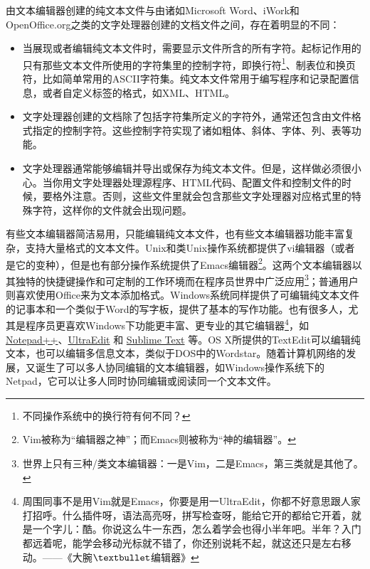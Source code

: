 \documentclass[11pt,a4paper,twoside]{book}
\begin{document}
由文本编辑器创建的纯文本文件与由诸如Microsoft Word、iWork和OpenOffice.org之类的文字处理器创建的文档文件之间，存在着明显的不同：
\begin{itemize}
  \item 当展现或者编辑纯文本文件时，需要显示文件所含的所有字符。起标记作用的只有那些文本文件所使用的字符集里的控制字符，即换行符\footnote{不同操作系统中的换行符有何不同？}、制表位和换页符，比如简单常用的ASCII字符集。纯文本文件常用于编写程序和记录配置信息，或者自定义标签的格式，如XML、HTML。
  \item 文字处理器创建的文档除了包括字符集所定义的字符外，通常还包含由文件格式指定的控制字符。这些控制字符实现了诸如粗体、斜体、字体、列、表等功能。
  \item 文字处理器通常能够编辑并导出或保存为纯文本文件。但是，这样做必须很小心。当你用文字处理器处理源程序、HTML代码、配置文件和控制文件的时候，要格外注意。否则，这些文件里就会包含那些文字处理器对应格式里的特殊字符，这样你的文件就会出现问题。
\end{itemize}

有些文本编辑器简洁易用，只能编辑纯文本文件，也有些文本编辑器功能丰富复杂，支持大量格式的文本文件。Unix和类Unix操作系统都提供了vi编辑器（或者是它的变种），但是也有部分操作系统提供了Emacs编辑器\footnote{Vim被称为“编辑器之神”；而Emacs则被称为“神的编辑器”。}。这两个文本编辑器以其独特的快捷键操作和可定制的工作环境而在程序员世界中广泛应用\footnote{世界上只有三种/类文本编辑器：一是Vim，二是Emacs，第三类就是其他了。}；普通用户则喜欢使用Office来为文本添加格式。Windows系统同样提供了可编辑纯文本文件的记事本和一个类似于Word的写字板，提供了基本的写作功能。也有很多人，尤其是程序员更喜欢Windows下功能更丰富、更专业的其它编辑器\footnote{周围同事不是用Vim就是Emacs，你要是用一UltraEdit，你都不好意思跟人家打招呼。什么插件呀，语法高亮呀，拼写检查呀，能给它开的都给它开着，就是一个字儿：酷。你说这么牛一东西，怎么着学会也得小半年吧。半年？入门都远着呢，能学会移动光标就不错了，你还别说耗不起，就这还只是左右移动。——《大腕$\textbullet$编辑器》}，如 \href{http://notepad-plus-plus.org/}{Notepad++}、\href{http://www.ultraedit.com/index.html}{UltraEdit} 和 \href{http://www.sublimetext.com/}{Sublime Text} 等。OS X所提供的TextEdit可以编辑纯文本，也可以编辑多信息文本，类似于DOS中的Wordstar。随着计算机网络的发展，又诞生了可以多人协同编辑的文本编辑器，如Windows操作系统下的Netpad，它可以让多人同时协同编辑或阅读同一个文本文件。
\end{document}
